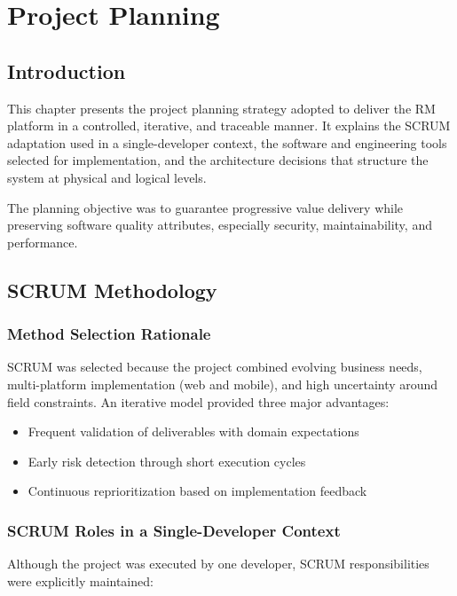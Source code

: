 \chapter{Project Planning}

\section{Introduction}

This chapter presents the project planning strategy adopted to deliver the RM platform in a controlled, iterative, and traceable manner. It explains the SCRUM adaptation used in a single-developer context, the software and engineering tools selected for implementation, and the architecture decisions that structure the system at physical and logical levels.

The planning objective was to guarantee progressive value delivery while preserving software quality attributes, especially security, maintainability, and performance.

\section{SCRUM Methodology}

\subsection{Method Selection Rationale}

SCRUM was selected because the project combined evolving business needs, multi-platform implementation (web and mobile), and high uncertainty around field constraints. An iterative model provided three major advantages:

\begin{itemize}
\item Frequent validation of deliverables with domain expectations
\item Early risk detection through short execution cycles
\item Continuous reprioritization based on implementation feedback
\end{itemize}

\subsection{SCRUM Roles in a Single-Developer Context}

Although the project was executed by one developer, SCRUM responsibilities were explicitly maintained:

